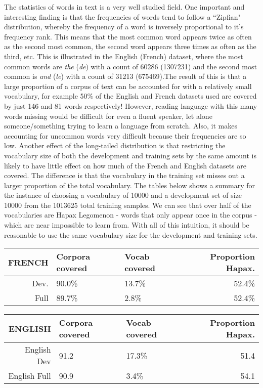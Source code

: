 \documentclass[]{article}
\begin{document}
The statistics of words in text is a very well studied field. One important and interesting finding is that the frequencies of words tend to follow a ``Zipfian" distribution, whereby the frequency of a word is inversely proportional to it's frequency rank. This means that the most common word appears twice as often as the second most common, the second word appears three times as often as the third, etc. This is illustrated in the English (French) dataset, where the most common words are \textit{the} (\textit{de}) with a count of 60286 (1307231) and the second most common is \textit{and} (\textit{le}) with a count of 31213 (675469).The result of this is that a large proportion of a corpus of text can be accounted for with a relatively small vocabulary, for example 50\% of the English and French datasets used are covered by just 146 and 81 words respectively! However, reading language with this many words missing would be difficult for even a fluent speaker, let alone someone/something trying to learn a language from scratch. Also, it makes accounting for uncommon words very difficult because their frequencies are so low. Another effect of the long-tailed distribution is that restricting the vocabulary size of both the development and training sets by the same amount is likely to have little effect on how much of the French and English datasets are covered. The difference is that the vocabulary in the training set misses out a larger proportion of the total vocabulary. The tables below shows a summary for the instance of choosing a vocabulary of 10000 and a development set of size 10000 from the 1013625 total training samples. We can see that over half of the vocabularies are Hapax Legomenon - words that only appear once in the corpus - which are near impossible to learn from.
With all of this intuition, it should be reasonable to use the same vocabulary size for the development and training sets.

\begin{tabular}{|r|l|l|r|}
	\hline
	 FRENCH &  Corpora covered & Vocab covered & Proportion Hapax. \\\hline
	Dev. & 90.0\% & 13.7\% & 52.4\%\\ \hline
	Full & 89.7\% & 2.8\% & 52.4\%\\ \hline
\end{tabular}

\begin{tabular}{|r|l|l|r|}
	\hline
	ENGLISH &  Corpora covered & Vocab covered & Proportion Hapax. \\\hline
	English Dev & 91.2 &  17.3\%& 51.4\\ \hline
	English Full & 90.9 &  3.4\% & 54.1\\  \hline
\end{tabular}
\end{document}
